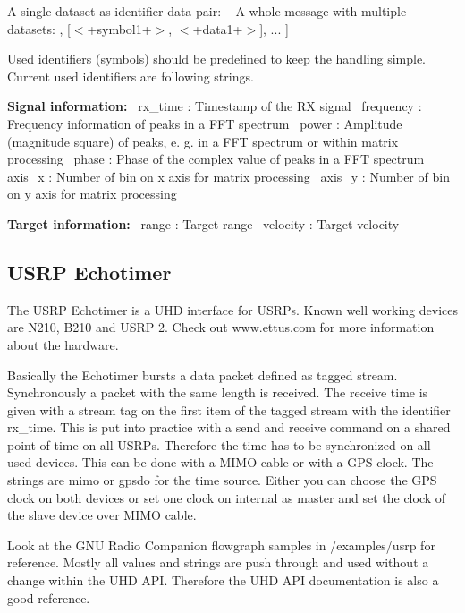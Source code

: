 A single dataset as identifier data pair\+: {~\newline
} A whole message with multiple datasets\+: {\ttfamily [ [$<$+symbol0+$>$, $<$+data0+$>$], [$<$+symbol1+$>$, $<$+data1+$>$], ... ]}

Used identifiers (symbols) should be predefined to keep the handling simple. Current used identifiers are following strings.

{\bfseries Signal information\+:}~\newline
{\ttfamily rx\+\_\+time} \+: Timestamp of the RX signal~\newline
{\ttfamily frequency} \+: Frequency information of peaks in a F\+FT spectrum~\newline
{\ttfamily power} \+: Amplitude (magnitude square) of peaks, e. g. in a F\+FT spectrum or within matrix processing~\newline
{\ttfamily phase} \+: Phase of the complex value of peaks in a F\+FT spectrum~\newline
{\ttfamily axis\+\_\+x} \+: Number of bin on x axis for matrix processing~\newline
{\ttfamily axis\+\_\+y} \+: Number of bin on y axis for matrix processing~\newline


{\bfseries Target information\+:}~\newline
{\ttfamily range} \+: Target range~\newline
{\ttfamily velocity} \+: Target velocity\subsection{U\+S\+R\+P Echotimer}\label{index_echotimer}
The U\+S\+RP Echotimer is a U\+HD interface for U\+S\+R\+Ps. Known well working devices are N210, B210 and U\+S\+RP 2. Check out www.\+ettus.\+com for more information about the hardware.

Basically the Echotimer bursts a data packet defined as tagged stream. Synchronously a packet with the same length is received. The receive time is given with a stream tag on the first item of the tagged stream with the identifier {\ttfamily rx\+\_\+time}. This is put into practice with a send and receive command on a shared point of time on all U\+S\+R\+Ps. Therefore the time has to be synchronized on all used devices. This can be done with a M\+I\+MO cable or with a G\+PS clock. The strings are {\ttfamily mimo} or {\ttfamily gpsdo} for the time source. Either you can choose the G\+PS clock on both devices or set one clock on {\ttfamily internal} as master and set the clock of the slave device over M\+I\+MO cable.

Look at the G\+NU Radio Companion flowgraph samples in {\ttfamily /examples/usrp} for reference. Mostly all values and strings are push through and used without a change within the U\+HD A\+PI. Therefore the U\+HD A\+PI documentation is also a good reference. 